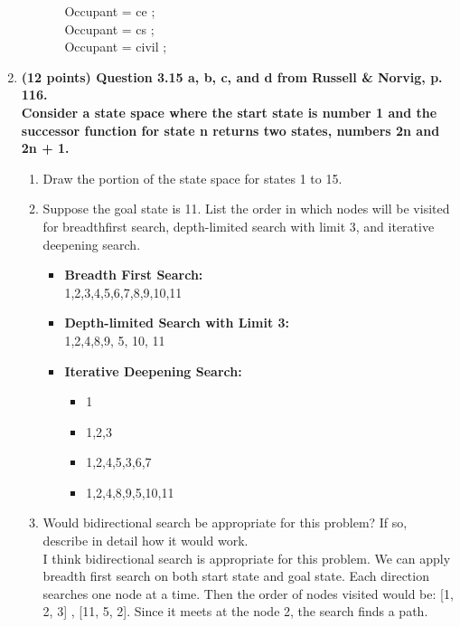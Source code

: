 \documentclass{article}%
\begin{document}
\begin{enumerate}
\begin{enumerate}
\begin{itemize}
		Occupant = ce ; \\

		Occupant = cs ; \\

		Occupant = civil ; 
		
		\end{itemize}

	\end{enumerate}



\item \textbf{(12 points) Question 3.15 a, b, c, and d from Russell \& Norvig, p. 116. \\
Consider a state space where the start state is number 1 and the successor function for
state n returns two states, numbers 2n and 2n + 1.}
	\begin{enumerate}
	\item Draw the portion of the state space for states 1 to 15.
	
	
	\item Suppose the goal state is 11. List the order in which nodes will be visited for breadthfirst
search, depth-limited search with limit 3, and iterative deepening search.

		\begin{itemize}
		\item \textbf{Breadth First Search:} \\
			1,2,3,4,5,6,7,8,9,10,11
		\item \textbf{Depth-limited Search with Limit 3:} \\
		    1,2,4,8,9, 5, 10, 11
		\item \textbf{Iterative Deepening Search:} \\
			\begin{itemize}
			\item 1
			\item 1,2,3
			\item 1,2,4,5,3,6,7
			\item 1,2,4,8,9,5,10,11
			\end{itemize}
		\end{itemize}
	\item Would bidirectional search be appropriate for this problem? If so, describe in detail
how it would work. \\

	I think bidirectional search is appropriate for this problem. We can apply breadth first search on both start state and goal state. Each direction searches one node at a time. Then the order of nodes visited would be: [1, 2, 3] , [11, 5, 2]. Since it meets at the node 2, the search finds a path.
	

\end{enumerate}
\end{enumerate}
\end{document}

